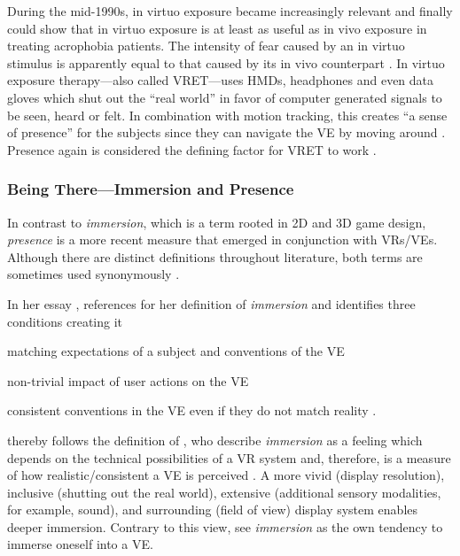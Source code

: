 During the mid-1990s, in virtuo exposure became increasingly relevant \autocites{Scharfenberger2012}[for example][]{Rothbaum1995, Rothbaum1995a} and finally \textcite{Emmelkamp2002} could show that in virtuo exposure is at least as useful as in vivo exposure in treating acrophobia patients. The intensity of fear caused by an in virtuo stimulus is apparently equal to that caused by its in vivo counterpart \autocite{Powers2008}. In virtuo exposure therapy---also called \gls{VRET}---uses \glspl{HMD}, headphones and even data gloves which shut out the “real world” in favor of computer generated signals to be seen, heard or felt. In combination with motion tracking, this creates “a sense of presence” for the subjects since they can navigate the \gls{VE} by moving around \autocite{Gregg2007}. Presence again is considered the defining factor for \gls{VRET} to work \autocite{Dinh1999,Hodges1994}. 

\subsubsection*{Being There---Immersion and Presence}

In contrast to \textit{immersion}, which is a term rooted in 2D and 3D game design, \textit{presence} is a more recent measure that emerged in conjunction with \glspl{VR}/\glspl{VE}. Although there are distinct definitions throughout literature, both terms are sometimes used synonymously \autocite{McMahan2003}.

In her essay , \textcite{McMahan2003} references \textcite{Murray1997} for her definition of \textit{immersion} and identifies three conditions creating it
\begin{inlinelist}
	\item matching expectations of a subject and conventions of the \gls{VE}
	\item non-trivial impact of user actions on the \gls{VE}
	\item consistent conventions in the \gls{VE} even if they do not match reality \autocite{Sheridan2000}.
\end{inlinelist}

\citeauthor{Murray1997} thereby follows the definition of \textcite{Slater1997}, who describe \textit{immersion} as a feeling which depends on the technical possibilities of a \gls{VR} system and, therefore, is a measure of how realistic/consistent a \gls{VE} is perceived \autocite{Slater1997}. A more vivid (display resolution), inclusive (shutting out the real world), extensive (additional sensory modalities, for example, sound), and surrounding (field of view) display system enables deeper immersion. Contrary to this view, \textcite{Witmer1998} see \textit{immersion} as the own tendency to immerse oneself into a \gls{VE}.

